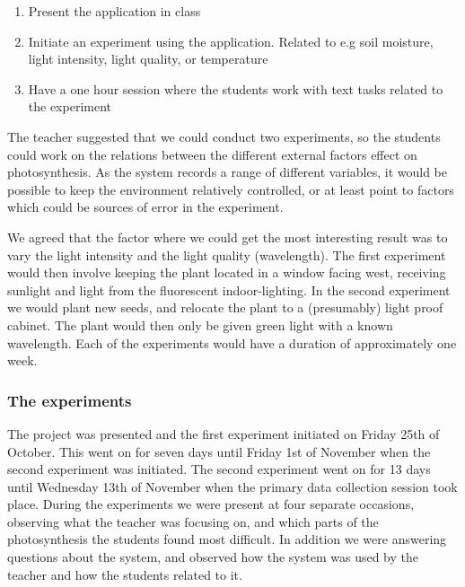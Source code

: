 \begin{enumerate}
\item{Present the application in class}
\item{Initiate an experiment using the application. Related to e.g soil moisture, light intensity, light quality, or temperature}
\item{Have a one hour session where the students work with text tasks related to the experiment}
\end{enumerate}

The teacher suggested that we could conduct two experiments, so the students could work on the relations between the different external factors effect on photosynthesis. As the system records a range of different variables, it would be possible to keep the environment relatively controlled, or at least point to factors which could be sources of error in the experiment. 

We agreed that the factor where we could get the most interesting result was to vary the light intensity and the light quality (wavelength). The first experiment would then involve keeping the plant located in a window facing west, receiving sunlight and light from the fluorescent indoor-lighting. In the second experiment we would plant new seeds, and relocate the plant to a (presumably) light proof cabinet. The plant would then only be given green light with a known wavelength. Each of the experiments would have a duration of approximately one week. 

\subsubsection{The experiments}
The project was presented and the first experiment initiated on Friday 25th of October. This went on for seven days until Friday 1st of November when the second experiment was initiated. The second experiment went on for 13 days until Wednesday 13th of November when the primary data collection session took place. During the experiments we were present at four separate occasions, observing what the teacher was focusing on, and which parts of the photosynthesis the students found most difficult. In addition we were answering questions about the system, and observed how the system was used by the teacher and how the students related to it. 

